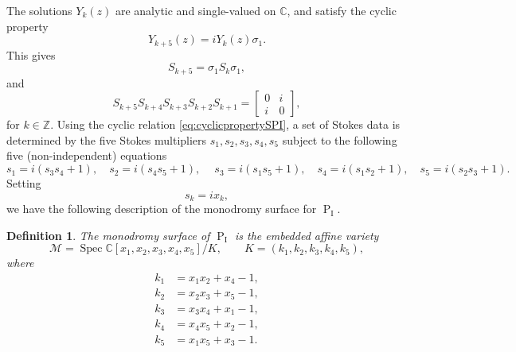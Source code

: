 \documentclass[a4paper,reqno]{amsart}
\numberwithin{equation}{section}
\newcommand{\Z}{\mathbb{Z}}
\newcommand{\C}{\mathbb{C}}
\newcommand{\pain}[1]{\operatorname{P}_{\mathrm{#1}}}
\DeclareMathOperator{\Spec}{Spec}
\newtheorem{definition}[theorem]{Definition}
\numberwithin{equation}{section}
\begin{document}
The solutions $Y_k(z)$ are analytic and single-valued on $\C$, and satisfy the cyclic property
\begin{equation} \label{eq:cyclicpropertyYPI}
    Y_{k+5}(z)=i Y_k(z)\sigma_1.
\end{equation}
This gives
\begin{equation} \label{eq:cyclicpropertySPI}
    S_{k+5}=\sigma_1S_k \sigma_1,
\end{equation}
and
$$S_{k+5} S_{k+4} S_{k+3} S_{k+2} S_{k+1} = \begin{bmatrix}
    0 & i\\
    i & 0
\end{bmatrix},$$
for $k\in\Z$.
Using the cyclic relation \eqref{eq:cyclicpropertySPI}, a set of Stokes data is determined by the five Stokes multipliers $s_1,s_2,s_3,s_4,s_5$ subject to the following five (non-independent) equations
\begin{equation*}\label{eq:stokesmultrelsPI}
s_1=i \left(s_3 s_4+1\right), \quad 
s_2=i \left(s_4 s_5+1\right), \quad \
s_3=i \left(s_1 s_5+1\right), \quad 
s_4=i \left(s_1 s_2+1\right),\quad 
s_5=i \left(s_2 s_3+1\right).
\end{equation*}
Setting 
$$s_k =  i x_k,$$
we have the following description of the monodromy surface for $\pain{I}$.
\begin{definition}\label{def:monodromysurfacePI}
    The monodromy surface of $\pain{I}$ is the embedded affine variety 
\begin{equation*}
        \mathcal{M} = \Spec\C[x_1,x_2,x_3,x_4,x_5]/ K, \qquad 
        K = (k_1,k_2,k_3,k_4,k_5),
\end{equation*}
where 
\begin{align*}
    k_1 &= x_1x_2+x_4-1, \\
    k_2 &= x_2x_3+x_5-1, \\
    k_3 &= x_3x_4+x_1-1, \\
    k_4 &= x_4x_5+x_2-1, \\
    k_5 &= x_1x_5+x_3-1.
\end{align*}
\end{definition}
\end{document}
